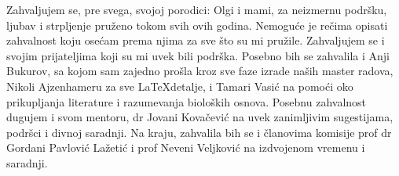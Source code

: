 \documentclass[
11pt, %
serbian,
singlespacing, %
headsepline, %
]{MastersDoctoralThesis} %
\begin{document}
\begin{acknowledgements}
\addchaptertocentry{\acknowledgementname} %
Zahvaljujem se, pre svega, svojoj porodici: Olgi i mami, za neizmernu podršku, ljubav i strpljenje pruženo tokom svih ovih godina. Nemoguće je rečima opisati zahvalnost koju osećam prema njima za sve što su mi pružile. Zahvaljujem se i svojim prijateljima koji su mi uvek bili podrška. Posebno bih se zahvalila i Anji Bukurov, sa kojom sam zajedno prošla kroz sve faze izrade naših master radova, Nikoli Ajzenhameru za sve \LaTeX detalje, i Tamari Vasić na pomoći oko prikupljanja literature i razumevanja bioloških osnova. Posebnu zahvalnost dugujem i svom mentoru, dr Jovani Kovačević na uvek zanimljivim sugestijama, podršci i divnoj saradnji. Na kraju, zahvalila bih se i članovima komisije prof dr Gordani Pavlović Lažetić i prof Neveni Veljković na izdvojenom vremenu i saradnji. 

\end{acknowledgements}

%





\tableofcontents %

\listoffigures %

\listoftables %


%
%

\end{document}
